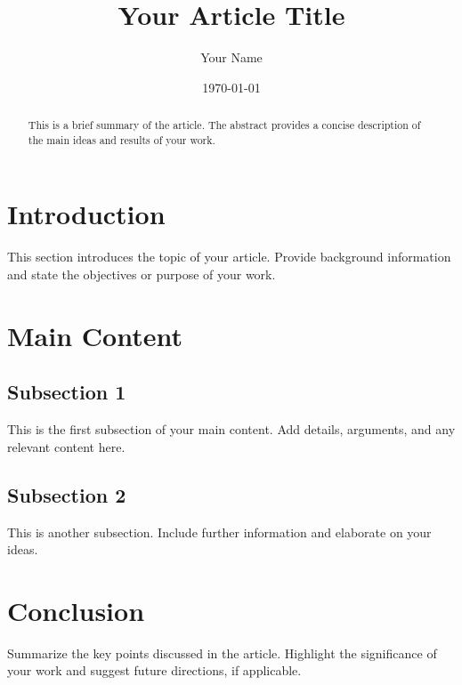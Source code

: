 \documentclass[12pt, oneside,english,hidelinks,a4paper]{article}
\title{Your Article Title}
\author{Your Name}
\date{\today} %
\begin{document}
\maketitle %

\begin{abstract}
This is a brief summary of the article. The abstract provides a concise description of the main ideas and results of your work.
\end{abstract}

\section{Introduction}
This section introduces the topic of your article. Provide background information and state the objectives or purpose of your work.

\section{Main Content}
\subsection{Subsection 1}
This is the first subsection of your main content. Add details, arguments, and any relevant content here.

\subsection{Subsection 2}
This is another subsection. Include further information and elaborate on your ideas.

\section{Conclusion}
Summarize the key points discussed in the article. Highlight the significance of your work and suggest future directions, if applicable.





\clearpage 
\normalsize 
 
 
\nocite{*}
\end{document}
